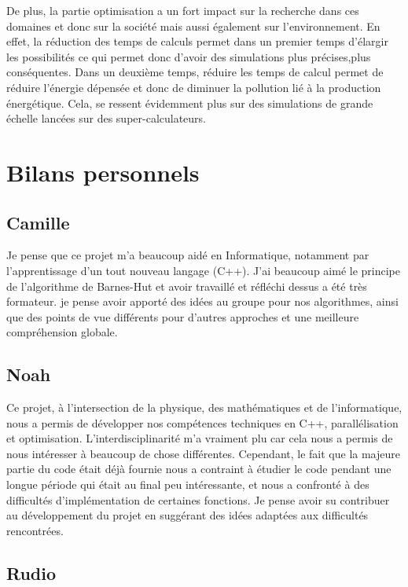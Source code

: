 De plus, la partie optimisation a un fort impact sur la recherche dans ces domaines et donc sur la société mais aussi également sur l'environnement. En effet, la réduction des temps de calculs permet dans un premier temps d'élargir les possibilités ce qui permet donc d'avoir des simulations plus précises,plus conséquentes. Dans un deuxième temps, réduire les temps de calcul permet de réduire l'énergie dépensée et donc de diminuer la pollution lié à la production énergétique. Cela, se ressent évidemment plus sur des simulations de grande échelle lancées sur des super-calculateurs.

\section{Bilans personnels}

\subsection{Camille}

Je pense que ce projet m’a beaucoup aidé en Informatique,
notamment par l'apprentissage d’un tout nouveau langage (C++).
J’ai beaucoup aimé le principe de l’algorithme de Barnes-Hut et
avoir travaillé et réfléchi dessus a été très formateur. je pense
avoir apporté des idées au groupe pour nos algorithmes, ainsi que
des points de vue différents pour d’autres approches et une
meilleure compréhension globale.

\subsection{Noah}


Ce projet, à l'intersection de la physique, des mathématiques et de l'informatique, nous a permis de développer nos compétences techniques en C++, parallélisation et optimisation. L'interdisciplinarité m'a vraiment plu car cela nous a permis de nous intéresser à beaucoup de chose différentes. Cependant, le fait que la majeure partie du code était déjà fournie nous a contraint à étudier le code pendant une longue période qui était au final peu intéressante, et nous a confronté à des difficultés d'implémentation de certaines fonctions. Je pense avoir su contribuer au développement du projet en suggérant des idées adaptées aux difficultés rencontrées.

\subsection{Rudio}



